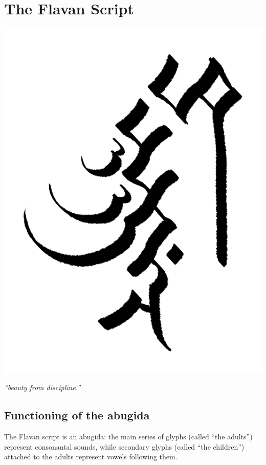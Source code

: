 \documentclass[10pt,oneside]{memoir}
\begin{document}
\chapter{The Flavan Script}\label{script}

\begin{center}
    \hspace{-60pt} \includegraphics[scale=2.1]{scriptchapter.png}

    \emph{``beauty from discipline.''}
\end{center}

\pagebreak

\section{Functioning of the abugida}

The Flavan script is an abugida: the main series of glyphs (called ``the adults'') represent consonantal sounds, while secondary glyphs (called ``the children'') attached to the adults represent vowels following them.
\end{document}
